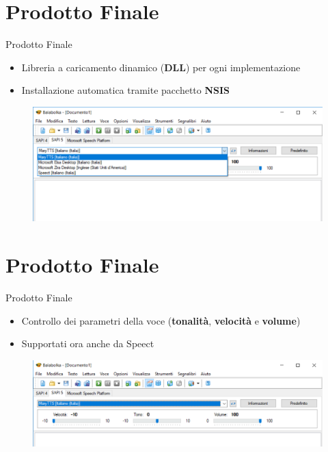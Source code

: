 \documentclass{beamer}
\begin{document}
\section{Prodotto Finale}
\begin{frame}{Prodotto Finale}
	\begin{itemize}
		\item Libreria a caricamento dinamico (\textbf{DLL}) per ogni implementazione
		\item Installazione automatica tramite pacchetto \textbf{NSIS}
	\end{itemize}
	\begin{figure}[H]
		\includegraphics[width=\textwidth]{images/prodotto-finale}
	\end{figure}
\end{frame}

\section{Prodotto Finale}
\begin{frame}{Prodotto Finale}
	\begin{itemize}
		\item Controllo dei parametri della voce  (\textbf{tonalità}, \textbf{velocità} e 
	    \textbf{volume})
		\item Supportati ora anche da Speect 
	\end{itemize}
	\begin{figure}[H]
		\includegraphics[width=\textwidth]{images/prodotto-finale-2}
	\end{figure}
\end{frame}
\end{document}
